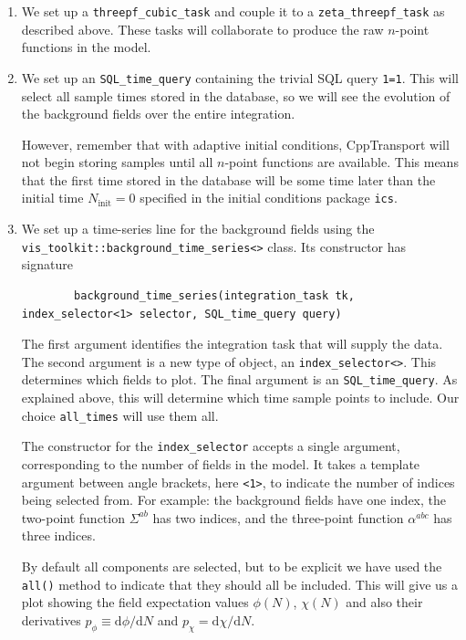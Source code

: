 \documentclass[11pt,a4paper]{article}
\renewcommand{\d}{\mathrm{d}}
\newcommand{\Ninit}{N_{\text{init}}}
\newcommand{\packagefont}{\sffamily}
\newcommand{\CppTransport}{{\packagefont CppTransport}}
\begin{document}
\begin{enumerate}
	\item We set up a \texttt{threepf_cubic_task} and couple it to a
	\texttt{zeta_threepf_task} as described above.
	These tasks will collaborate to produce the raw $n$-point functions in the model.
	
	\item We set up an \texttt{SQL_time_query} containing the trivial
	SQL query \texttt{1=1}. This will select all sample times stored in the database,
	so we will see the evolution of the background fields over the entire integration.

	However, remember that with adaptive initial conditions, {\CppTransport} will not begin
	storing samples until all $n$-point functions are available. This means that the
	first time stored in the database will be some time later than the initial time
	$\Ninit = 0$ specified in the initial conditions package
	\texttt{ics}.
	
	\item We set up a time-series line for the background fields using the
	\texttt{vis_toolkit::background_time_series<>} class.
	Its constructor has signature
	\begin{verbatim}
		background_time_series(integration_task tk, index_selector<1> selector, SQL_time_query query)
	\end{verbatim}
	The first argument identifies the integration task that will supply the data.
	The second argument is a new type of object,
	an \texttt{index_selector<>}.
	This determines which fields to plot.
	The final argument is an \texttt{SQL_time_query}.
	As explained above, this will determine which time sample points to include.
	Our choice \texttt{all_times} will use them all.
	
	The constructor for the \texttt{index_selector}
	accepts a single argument, corresponding to the number of fields in the model.
	It takes a template argument between angle brackets,
	here \texttt{<1>},
	to indicate the number of indices being selected from.
	For example: the background fields have one index,
	the two-point function $\Sigma^{ab}$ has two indices, and
	the three-point function $\alpha^{abc}$ has three indices.

	By default all components are selected, but to be explicit we have used the
	\texttt{all()} method to indicate that they should all be included.
	This will give us a plot showing the field expectation values
	$\phi(N)$, $\chi(N)$
	and also their derivatives $p_\phi \equiv \d \phi / \d N$
	and $p_\chi = \d \chi / \d N$.
	

\end{enumerate}
\end{document}
